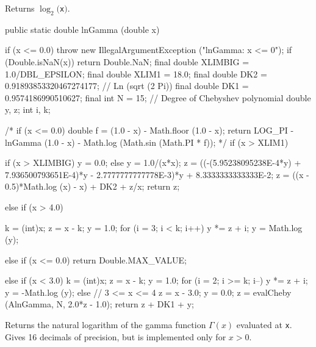  \begin{tabb} Returns $\log_2 ($\texttt{x}$)$.
 \end{tabb}
 \begin{htmlonly}
 \end{htmlonly}
\begin{code}

   public static double lnGamma (double x)\begin{hide} {
      if (x <= 0.0)
         throw new IllegalArgumentException ("lnGamma:   x <= 0");
      if (Double.isNaN(x))
         return Double.NaN;
      final double XLIMBIG = 1.0/DBL_EPSILON;
      final double XLIM1 = 18.0;
      final double DK2 = 0.91893853320467274177;     // Ln (sqrt (2 Pi))
      final double DK1 = 0.9574186990510627;
      final int N = 15;              // Degree of Chebyshev polynomial
      double y, z;
      int i, k;

/*
      if (x <= 0.0) {
         double f = (1.0 - x) - Math.floor (1.0 - x);
         return LOG_PI - lnGamma (1.0 - x) - Math.log (Math.sin (Math.PI * f));
      }
*/
      if (x > XLIM1) {
         if (x > XLIMBIG)
            y = 0.0;
         else
            y = 1.0/(x*x);
         z = ((-(5.95238095238E-4*y) + 7.936500793651E-4)*y -
            2.7777777777778E-3)*y + 8.3333333333333E-2;
         z = ((x - 0.5)*Math.log (x) - x) + DK2 + z/x;
         return z;

      } else if (x > 4.0) {
         k = (int)x;
         z = x - k;
         y = 1.0;
         for (i = 3; i < k; i++)
            y *= z + i;
         y = Math.log (y);

      } else if (x <= 0.0)
         return Double.MAX_VALUE;

      else if (x < 3.0) {
         k = (int)x;
         z = x - k;
         y = 1.0;
         for (i = 2; i >= k; i--)
            y *= z + i;
         y = -Math.log (y);
      }
      else {           // 3 <= x <= 4
         z = x - 3.0;
         y = 0.0;
      }
      z = evalCheby (AlnGamma, N, 2.0*z - 1.0);
      return z + DK1 + y;
   }\end{hide}
\end{code}
  \begin{tabb} Returns the natural logarithm of the gamma function $\Gamma(x)$
   evaluated at \texttt{x}.
   Gives 16 decimals of precision, but is implemented only for $x>0$.
  \end{tabb}
  \begin{htmlonly}
 \end{htmlonly}
